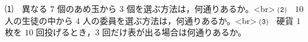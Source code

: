 ⑴　異なる $7$ 個のあめ玉から $3$ 個を選ぶ方法は，何通りあるか。<br>
⑵　$10$ 人の生徒の中から $4$ 人の委員を選ぶ方法は，何通りあるか。<br>
⑶　硬貨 $1$ 枚を $10$ 回投げるとき，$3$ 回だけ表が出る場合は何通りあるか。
